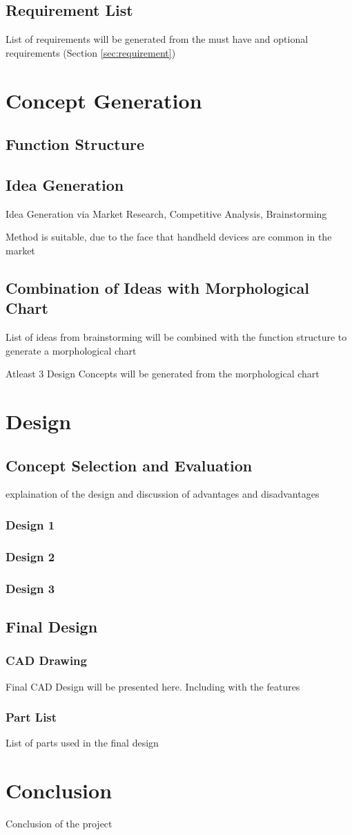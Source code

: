 \section{Requirement List}
List of requirements will be generated from the must have and optional requirements (Section \ref{sec:requirement})
\chapter{Concept Generation}
\section{Function Structure}

\section{Idea Generation}
Idea Generation via Market Research, Competitive Analysis, Brainstorming

Method is suitable, due to the face that handheld devices are common in the market
\section{Combination of Ideas with Morphological Chart}
List of ideas from brainstorming will be combined with the function structure to generate a morphological chart

Atleast 3 Design Concepts will be generated from the morphological chart

\chapter{Design}
\section{Concept Selection and Evaluation}
explaination of the design and discussion of advantages and disadvantages
\subsection{Design 1}
\subsection{Design 2}
\subsection{Design 3}

\section{Final Design}
\subsection{CAD Drawing}
Final CAD Design will be presented here.
Including with the features
\subsection{Part List}
List of parts used in the final design

\chapter{Conclusion}
Conclusion of the project